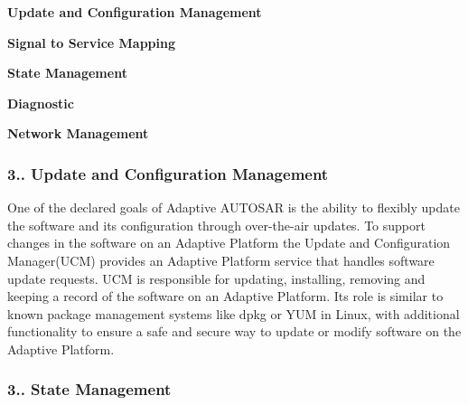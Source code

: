 \begin{DoxyItemize}
\item {\bfseries Update and Configuration Management}
\item {\bfseries Signal to Service Mapping}
\item {\bfseries State Management}
\item {\bfseries Diagnostic}
\item {\bfseries Network Management}
\end{DoxyItemize}

\subsubsection*{3.. Update and Configuration Management}

One of the declared goals of Adaptive A\+U\+T\+O\+S\+AR is the ability to flexibly update the software and its configuration through over-\/the-\/air updates. To support changes in the software on an Adaptive Platform the Update and Configuration Manager(\+U\+C\+M) provides an Adaptive Platform service that handles software update requests.  U\+CM is responsible for updating, installing, removing and keeping a record of the software on an Adaptive Platform. Its role is similar to known package management systems like dpkg or Y\+UM in Linux, with additional functionality to ensure a safe and secure way to update or modify software on the Adaptive Platform.

\subsubsection*{3.. State Management}

